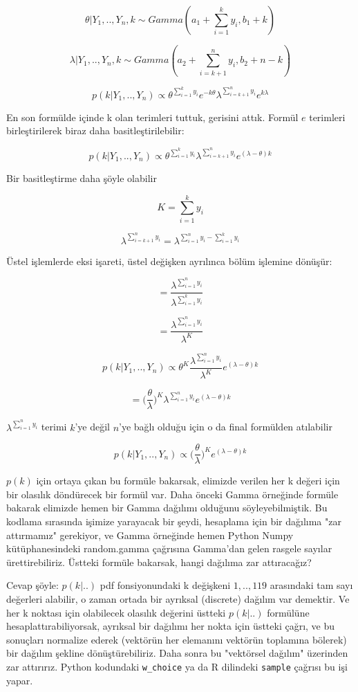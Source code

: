 \documentclass[12pt,fleqn]{article}\usepackage{../../common}
\begin{document}
$$ \theta | Y_1,..,Y_n,k \sim Gamma(a_1 + \sum_{i=1}^{k} y_i, b_1+k) $$

$$ \lambda | Y_1,..,Y_n,k \sim Gamma(a_2 + \sum_{i=k+1}^{n} y_i, b_2+n-k) $$

$$ 
p(k | Y_1,..,Y_n) \propto \theta^{\sum_{i=1}^{k} y_i}e^{-k\theta} 
\lambda^{\sum_{i=k+1}^n y_i}e^{k\lambda} 
 $$

En son formülde içinde k olan terimleri tuttuk, gerisini attık. Formül $e$
terimleri birleştirilerek biraz daha basitleştirilebilir:

$$ p(k | Y_1,..,Y_n) \propto
\theta^{\sum_{i=1}^{k} y_i} \lambda^{\sum_{i=k+1}^n y_i}e^{(\lambda-\theta)k} 
 $$

Bir basitleştirme daha şöyle olabilir

$$ K = \sum_{i=1}^{k} y_i  $$

$$ \lambda^{\sum_{i=k+1}^n y_i} = \lambda^{\sum_{i=1}^n y_i - \sum_{i=1}^k y_i} $$

Üstel işlemlerde eksi işareti, üstel değişken ayrılınca bölüm işlemine dönüşür:

$$ = \frac{\lambda^{\sum_{i=1}^n y_i}}{\lambda ^{\sum_{i=1}^k y_i}} $$

$$ = \frac{\lambda^{\sum_{i=1}^n y_i}}{\lambda ^{K}} $$

$$ p(k | Y_1,..,Y_n) \propto 
\theta^{K} \frac{\lambda^{\sum_{i=1}^n y_i}}{\lambda ^{K}} e^{(\lambda-\theta)k} 
 $$

$$ = \bigg(\frac{\theta}{\lambda}\bigg)^{K} \lambda^{\sum_{i=1}^n  y_i} e^{(\lambda-\theta)k} $$

$\lambda^{\sum_{i=1}^n y_i}$ terimi $k$'ye değil $n$'ye bağlı olduğu
için o da final formülden atılabilir

$$  
p(k | Y_1,..,Y_n) \propto \bigg(\frac{\theta}{\lambda}\bigg)^{K} 
e^{(\lambda-\theta)k}  
$$  

$p(k)$ için ortaya çıkan bu formüle bakarsak, elimizde verilen her k
değeri için bir olasılık döndürecek bir formül var. Daha önceki Gamma
örneğinde formüle bakarak elimizde hemen bir Gamma dağılımı olduğunu
söyleyebilmiştik. Bu kodlama sırasında işimize yarayacak bir şeydi,
hesaplama için bir dağılıma "zar attırmamız" gerekiyor, ve Gamma
örneğinde hemen Python Numpy kütüphanesindeki random.gamma çağrısına
Gamma'dan gelen rasgele sayılar ürettirebiliriz. Üstteki formüle
bakarsak, hangi dağılıma zar attıracağız?

Cevap şöyle: $p(k|..)$ pdf fonsiyonundaki k değişkeni $1,..,119$ arasındaki
tam sayı değerleri alabilir, o zaman ortada bir ayrıksal (discrete) dağılım
var demektir. Ve her k noktası için olabilecek olasılık değerini üstteki
$p(k|..)$ formülüne hesaplattırabiliyorsak, ayrıksal bir dağılımı her nokta
için üstteki çağrı, ve bu sonuçları normalize ederek (vektörün her
elemanını vektörün toplamına bölerek) bir dağılım şekline
dönüştürebiliriz. Daha sonra bu "vektörsel dağılım" üzerinden zar
attırırız. Python kodundaki \verb!w_choice! ya da R dilindeki \verb!sample!
çağrısı bu işi yapar.
\end{document}
